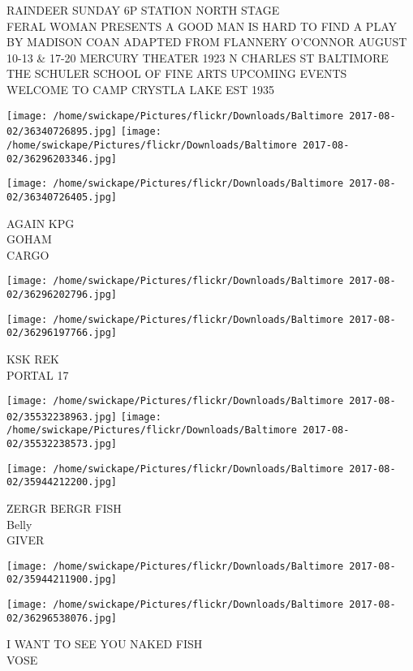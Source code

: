 \documentclass[10pt,letterpaper]{article}
\begin{document}
RAINDEER SUNDAY 6P STATION NORTH STAGE\\
FERAL WOMAN PRESENTS A GOOD MAN IS HARD TO FIND A PLAY BY MADISON COAN ADAPTED FROM FLANNERY O'CONNOR AUGUST 10{-}13 \& 17{-}20 MERCURY THEATER 1923 N CHARLES ST BALTIMORE\\
THE SCHULER SCHOOL OF FINE ARTS UPCOMING EVENTS\\
WELCOME TO CAMP CRYSTLA LAKE EST 1935
\pagebreak

\texttt{[image: /home/swickape/Pictures/flickr/Downloads/Baltimore 2017-08-02/36340726895.jpg]}
\texttt{[image: /home/swickape/Pictures/flickr/Downloads/Baltimore 2017-08-02/36296203346.jpg]}

\texttt{[image: /home/swickape/Pictures/flickr/Downloads/Baltimore 2017-08-02/36340726405.jpg]}

AGAIN KPG\\
GOHAM\\
CARGO
\pagebreak

\texttt{[image: /home/swickape/Pictures/flickr/Downloads/Baltimore 2017-08-02/36296202796.jpg]}

\vspace{0.25in}
\texttt{[image: /home/swickape/Pictures/flickr/Downloads/Baltimore 2017-08-02/36296197766.jpg]}

KSK REK\\
PORTAL 17
\pagebreak

\texttt{[image: /home/swickape/Pictures/flickr/Downloads/Baltimore 2017-08-02/35532238963.jpg]}
\texttt{[image: /home/swickape/Pictures/flickr/Downloads/Baltimore 2017-08-02/35532238573.jpg]}

\texttt{[image: /home/swickape/Pictures/flickr/Downloads/Baltimore 2017-08-02/35944212200.jpg]}

ZERGR BERGR FISH\\
Belly\\
GIVER
\pagebreak

\texttt{[image: /home/swickape/Pictures/flickr/Downloads/Baltimore 2017-08-02/35944211900.jpg]}

\vspace{0.25in}
\texttt{[image: /home/swickape/Pictures/flickr/Downloads/Baltimore 2017-08-02/36296538076.jpg]}

I WANT TO SEE YOU NAKED FISH\\
VOSE
\pagebreak
\end{document}
